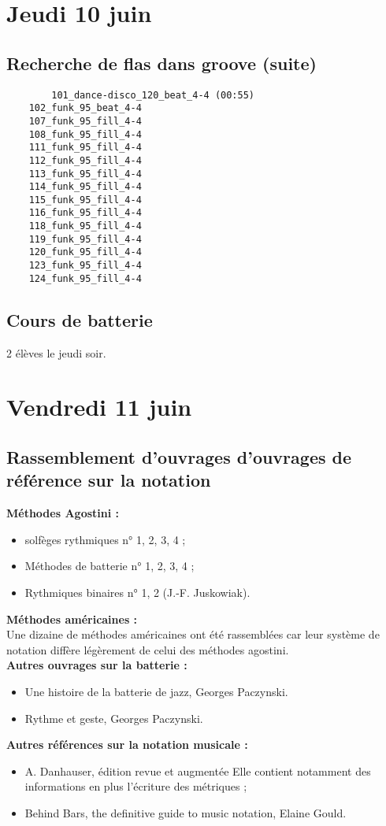 \documentclass{report}
\begin{document}
	\section{Jeudi 10 juin}
	\subsection{Recherche de flas dans groove (suite)}
	\begin{verbatim}
		101_dance-disco_120_beat_4-4 (00:55)
	102_funk_95_beat_4-4
	107_funk_95_fill_4-4
	108_funk_95_fill_4-4
	111_funk_95_fill_4-4
	112_funk_95_fill_4-4
	113_funk_95_fill_4-4
	114_funk_95_fill_4-4
	115_funk_95_fill_4-4
	116_funk_95_fill_4-4
	118_funk_95_fill_4-4
	119_funk_95_fill_4-4
	120_funk_95_fill_4-4
	123_funk_95_fill_4-4
	124_funk_95_fill_4-4
	\end{verbatim}
	\subsection{Cours de batterie}
	2 élèves le jeudi soir.
	\newpage
	\section{Vendredi 11 juin}
	\subsection{Rassemblement d’ouvrages d’ouvrages de référence sur la notation}
	\textbf{Méthodes Agostini :}
	\begin{itemize}
		\item solfèges rythmiques n° 1, 2, 3, 4 ;
		\item Méthodes de batterie n° 1, 2, 3, 4 ;
		\item Rythmiques binaires n° 1, 2 (J.-F. Juskowiak).\\
	\end{itemize}
	\textbf{Méthodes américaines :}\\
	Une dizaine de méthodes américaines ont été rassemblées car leur système de notation diffère légèrement de celui des méthodes agostini.\\
	
	\textbf{Autres ouvrages sur la batterie :}
	\begin{itemize}
		\item Une histoire de la batterie de jazz, Georges Paczynski.
		\item Rythme et geste, Georges Paczynski.\\
	\end{itemize}
	\textbf{Autres références sur la notation musicale :}
\begin{itemize}
	\item A. Danhauser, édition revue et augmentée
	Elle contient notamment des informations en plus l’écriture des métriques ;
	\item Behind Bars, the definitive guide to music notation, Elaine Gould.\\
\end{itemize}
\end{document}
